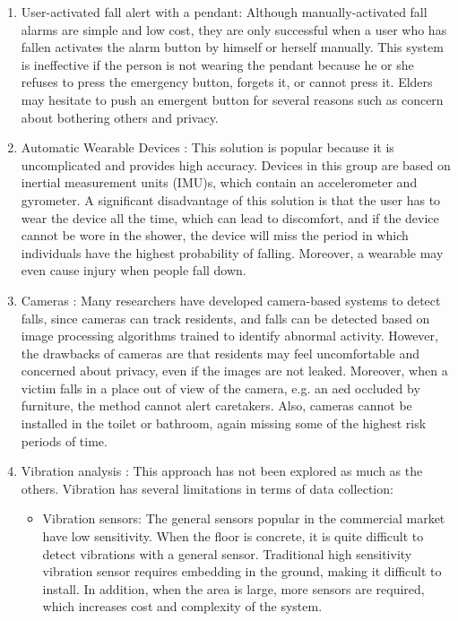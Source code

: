 \begin{enumerate}
\item User-activated fall alert with a pendant: Although manually-activated fall alarms are simple and low cost, they are only successful when a user who has fallen activates the alarm button by himself or herself manually. This system is ineffective if the person is not wearing the pendant because he or she refuses to press the emergency button, forgets it, or cannot press it. Elders may hesitate to push an emergent button for several reasons such as concern about bothering others and privacy.
\item Automatic Wearable Devices \cite{degen_jaeckel_rufer_wyss_2003, yang_hsu_2010, rihana_mondalak_2016}: This solution is popular because it is uncomplicated and provides high accuracy. Devices in this group are based on inertial measurement units (IMU)s, which contain an accelerometer and gyrometer. A significant disadvantage of this solution is that the user has to wear the device all the time, which can lead to discomfort, and if the device cannot be wore in the shower, the device will miss the period in which individuals have the highest probability of falling. Moreover, a wearable may even cause injury when people fall down.
\item Cameras \cite{tsai_hsu_2019, ramirez_velastin_meza_fabregas_makris_farias_2021,taufeeque_koita_spicher_deserno_2021}: Many researchers have developed camera-based systems to detect falls, since cameras can track residents, and falls can be detected based on image processing algorithms trained to identify abnormal activity. However, the drawbacks of cameras are that residents may feel uncomfortable and concerned about privacy, even if the images are not leaked. Moreover, when a victim falls in a place out of view of the camera, e.g. an aed occluded by furniture, the method cannot alert caretakers. Also, cameras cannot be installed in the toilet or bathroom, again missing some of the highest risk periods of time.
\item Vibration analysis
\cite{alwan_rajendran_kell_mack_dalal_wolfe_felder_2006,liu_jiang_su_benzoni_maxwell_2019,clemente_li_valero_song_2020}: This approach has not been explored as much as the others. Vibration has several limitations in terms of data collection:
\begin{itemize}
\item Vibration sensors: The general sensors popular in the commercial market have low sensitivity. When the floor is concrete, it is quite difficult to detect vibrations with a general sensor. Traditional high sensitivity vibration sensor requires embedding in the ground, making it difficult to install. In addition, when the area is large, more sensors are required, which increases cost and complexity of the system.

\end{itemize}
\end{enumerate}

